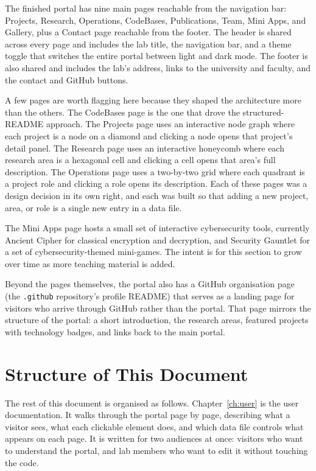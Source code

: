 The finished portal has nine main pages reachable from the navigation bar: Projects, Research, Operations, CodeBases, Publications, Team, Mini Apps, and Gallery, plus a Contact page reachable from the footer. The header is shared across every page and includes the lab title, the navigation bar, and a theme toggle that switches the entire portal between light and dark mode. The footer is also shared and includes the lab's address, links to the university and faculty, and the contact and GitHub buttons.

A few pages are worth flagging here because they shaped the architecture more than the others. The CodeBases page is the one that drove the structured-README approach. The Projects page uses an interactive node graph where each project is a node on a diamond and clicking a node opens that project's detail panel. The Research page uses an interactive honeycomb where each research area is a hexagonal cell and clicking a cell opens that area's full description. The Operations page uses a two-by-two grid where each quadrant is a project role and clicking a role opens its description. Each of these pages was a design decision in its own right, and each was built so that adding a new project, area, or role is a single new entry in a data file.

The Mini Apps page hosts a small set of interactive cybersecurity tools, currently Ancient Cipher for classical encryption and decryption, and Security Gauntlet for a set of cybersecurity-themed mini-games. The intent is for this section to grow over time as more teaching material is added.

Beyond the pages themselves, the portal also has a GitHub organisation page (the \texttt{.github} repository's profile README) that serves as a landing page for visitors who arrive through GitHub rather than the portal. That page mirrors the structure of the portal: a short introduction, the research areas, featured projects with technology badges, and links back to the main portal.

\section{Structure of This Document}\label{sec:intro-structure}

The rest of this document is organised as follows. Chapter~\ref{ch:user} is the user documentation. It walks through the portal page by page, describing what a visitor sees, what each clickable element does, and which data file controls what appears on each page. It is written for two audiences at once: visitors who want to understand the portal, and lab members who want to edit it without touching the code.

